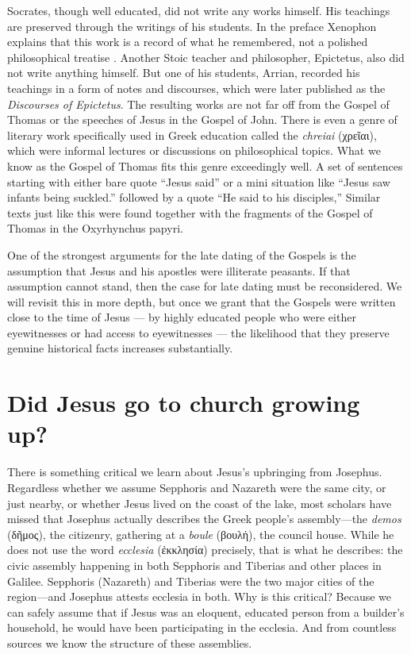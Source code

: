 Socrates, though well educated, did not write any works himself.
His teachings are preserved through the writings of his students.
In the preface Xenophon explains that this work is a record of what he remembered, not a polished philosophical treatise \cite[1.1]{xenophon:memorabilia}.
Another Stoic teacher and philosopher, Epictetus, also did not write anything himself.
But one of his students, Arrian, recorded his teachings in a form of notes and discourses, which were later published as the \emph{Discourses of Epictetus}.
The resulting works are not far off from the Gospel of Thomas or the speeches of Jesus in the Gospel of John.
There is even a genre of literary work specifically used in Greek education called the \emph{chreiai} (χρεῖαι), which were informal lectures or discussions on philosophical topics.
What we know as the Gospel of Thomas fits this genre exceedingly well.
A set of sentences starting with either bare quote “Jesus said” or a mini situation like ``Jesus saw infants being suckled.'' followed by a quote ``He said to his disciples,''
Similar texts just like this were found together with the fragments of the Gospel of Thomas in the Oxyrhynchus papyri.

One of the strongest arguments for the late dating of the Gospels is the assumption that Jesus and his apostles were illiterate peasants.
If that assumption cannot stand, then the case for late dating must be reconsidered.
We will revisit this in more depth, but once we grant that the Gospels were written close to the time of Jesus --- by highly educated people who were either eyewitnesses or had access to eyewitnesses --- the likelihood that they preserve genuine historical facts increases substantially.

\section{Did Jesus go to church growing up?}\label{sec:jesus-go-to-church}

There is something critical we learn about Jesus's upbringing from Josephus.
Regardless whether we assume Sepphoris and Nazareth were the same city, or just nearby, or whether Jesus lived on the coast of the lake, most scholars have missed that Josephus actually describes the Greek people's assembly---the \emph{demos} (δῆμος), the citizenry, gathering at a \emph{boule} (βουλή), the council house.
While he does not use the word \emph{ecclesia} (ἐκκλησία) precisely, that is what he describes: the civic assembly happening in both Sepphoris and Tiberias and other places in Galilee.
Sepphoris (Nazareth) and Tiberias were the two major cities of the region---and Josephus attests ecclesia in both.
Why is this critical?
Because we can safely assume that if Jesus was an eloquent, educated person from a builder's household, he would have been participating in the ecclesia.
And from countless sources we know the structure of these assemblies.

